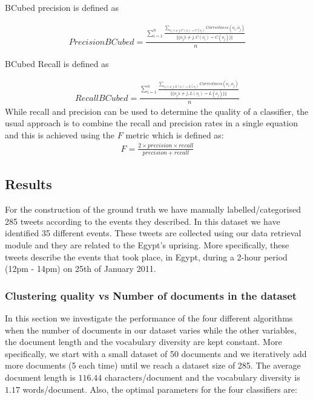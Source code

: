 BCubed precision is defined as 

\begin{eqnarray}
Precision BCubed = \frac{ \sum_{i=1}^{n} \frac{\sum_{o_j:i \neq j, C(o_i)=C(o_j)}^{} Correctness(o_i, o_j)}{\Vert \{ o_j | i \neq j, C(o_i) = C(o_j)  \}  \Vert} }{n}
\end{eqnarray} 

BCubed Recall is defined as

\begin{eqnarray}
Recall BCubed = \frac{ \sum_{i=1}^{n} \frac{\sum_{o_j:i \neq j, L(o_i)=L(o_j)}^{} Correctness(o_i, o_j)}{\Vert \{ o_j | i \neq j, L(o_i) = L(o_j)  \}  \Vert} }{n}
\end{eqnarray} 
While recall and precision can be used to determine the quality of a classifier, the usual approach is to combine the recall and precision rates in a single equation and this is 
achieved using the $F$ metric which is defined as:
\begin{eqnarray}
F = \frac{2 \times precision \times recall}{precision + recall}
\end{eqnarray} 
    
\subsection{Results}
For the construction of the ground truth we have manually labelled/categorised 285 tweets according to the events they described. In this dataset we have identified 35 different events. These tweets are collected using our data retrieval module and they are related to the Egypt's uprising. More specifically, these tweets describe the events that took place, in Egypt, during a 2-hour period (12pm - 14pm) on 25th of January 2011.    

\subsubsection{Clustering quality vs Number of documents in the dataset}\label{EvalDiffNoDocs}
In this section we investigate the performance of the four different algorithms when the number of documents in our dataset varies while the other variables, the document length and the vocabulary diversity are kept constant. More specifically, we start with a small dataset of 50 documents and we iteratively add more documents (5 each time) until we reach a dataset size of 285. The average document length is $116.44$ characters/document and the vocabulary diversity is $1.17$ words/document. Also, the optimal parameters for the four classifiers are:

